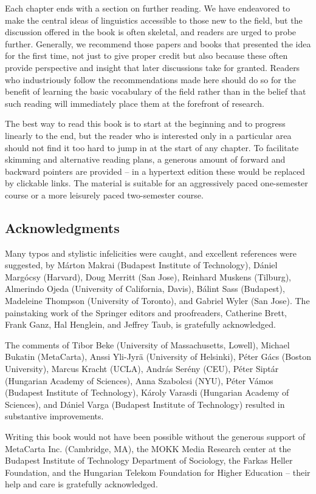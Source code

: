 Each chapter ends with a section on further reading.  We have endeavored to
make the central ideas of linguistics accessible to those new to the field,
but the discussion offered in the book is often skeletal, and readers are
urged to probe further. Generally, we recommend those papers and books that
presented the idea for the first time, not just to give proper credit but
also because these often provide perspective and insight that later
discussions take for granted. Readers who industriously follow the
recommendations made here should do so for the benefit of learning the basic
vocabulary of the field rather than in the belief that such reading will
immediately place them at the forefront of research. 

The best way to read this book is to start at the beginning and to progress
linearly to the end, but the reader who is interested only in a particular
area should not find it too hard to jump in at the start of any chapter. To
facilitate skimming and alternative reading plans, a generous amount of
forward and backward pointers are provided -- in a hypertext edition these
would be replaced by clickable links. The material is suitable for an
aggressively paced one-semester course or a more leisurely paced two-semester
course. 

\subsection*{Acknowledgments}

Many typos and stylistic infelicities were caught, and excellent references
were suggested, by M\'{ar}ton Makrai (Budapest Institute of Technology),
D\'aniel Marg\'ocsy (Harvard), Doug Merritt (San Jose), Reinhard Muskens
(Tilburg), Almerindo Ojeda (University of California, Davis), B\'alint Sass
(Budapest), Madeleine Thompson (University of Toronto), and Gabriel Wyler (San
Jose). The painstaking work of the Springer editors and proofreaders, 
Catherine Brett, Frank Ganz, Hal Henglein, and Jeffrey Taub, is gratefully 
acknowledged. 

The comments of Tibor Beke (University of Massachusetts, Lowell), Michael
Buka\-tin (MetaCarta), Anssi Yli-Jyr\"{a} (University of Helsinki), P\'eter
G\'acs (Boston University), Marcus Kracht (UCLA), Andr\'{a}s Ser\'{e}ny (CEU),
P\'{e}ter Sipt\'{a}r (Hungarian Academy of Sciences), Anna Sza\-bolcsi (NYU),
P\'{e}ter V\'{a}mos (Budapest Institute of Technology), K\'{a}roly Varasdi
(Hungarian Academy of Sciences), and D\'aniel Varga (Budapest Institute of
Technology) resulted in substantive improvements.

Writing this book would not have been possible without the generous support of
MetaCarta Inc. (Cambridge, MA), the MOKK Media Research center at the Budapest
Institute of Technology Department of Sociology, the Farkas Heller Foundation,
and the Hungarian Telekom Foundation for Higher Education -- their help and
care is gratefully acknowledged. 

\endinput


